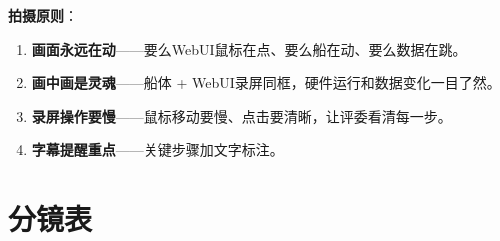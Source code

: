 \documentclass[12pt,a4paper]{article}
\begin{document}
\vspace{0.5cm}

\textbf{拍摄原则}：

\begin{enumerate}[leftmargin=*,itemsep=3pt]
  \item \textbf{画面永远在动}——要么WebUI鼠标在点、要么船在动、要么数据在跳。
  \item \textbf{画中画是灵魂}——船体 + WebUI录屏同框，硬件运行和数据变化一目了然。
  \item \textbf{录屏操作要慢}——鼠标移动要慢、点击要清晰，让评委看清每一步。
  \item \textbf{字幕提醒重点}——关键步骤加文字标注。
\end{enumerate}

\newpage

\section{分镜表}
\end{document}
